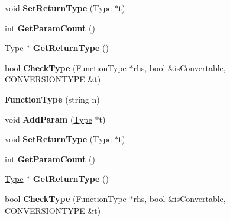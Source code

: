 \begin{DoxyCompactItemize}
\item 
\hypertarget{classFunctionType_a1462775c5732b70b07c689ab7088814d}{void {\bfseries Set\-Return\-Type} (\hyperlink{classType}{Type} $\ast$t)}\label{classFunctionType_a1462775c5732b70b07c689ab7088814d}

\item 
\hypertarget{classFunctionType_a8b6fed7ff4d79b5db3d39cd042326090}{int {\bfseries Get\-Param\-Count} ()}\label{classFunctionType_a8b6fed7ff4d79b5db3d39cd042326090}

\item 
\hypertarget{classFunctionType_a601e763553086c0d7a4c2de97d6de2bc}{\hyperlink{classType}{Type} $\ast$ {\bfseries Get\-Return\-Type} ()}\label{classFunctionType_a601e763553086c0d7a4c2de97d6de2bc}

\item 
\hypertarget{classFunctionType_a150840d05c02a26ca776aad22e0deed1}{bool {\bfseries Check\-Type} (\hyperlink{classFunctionType}{Function\-Type} $\ast$rhs, bool \&is\-Convertable, C\-O\-N\-V\-E\-R\-S\-I\-O\-N\-T\-Y\-P\-E \&t)}\label{classFunctionType_a150840d05c02a26ca776aad22e0deed1}

\item 
\hypertarget{classFunctionType_a924981ea6fc18a7a9ed4cb5c94a136d6}{{\bfseries Function\-Type} (string n)}\label{classFunctionType_a924981ea6fc18a7a9ed4cb5c94a136d6}

\item 
\hypertarget{classFunctionType_a9259c94250b6cb903c6013bc10a0b7bc}{void {\bfseries Add\-Param} (\hyperlink{classType}{Type} $\ast$t)}\label{classFunctionType_a9259c94250b6cb903c6013bc10a0b7bc}

\item 
\hypertarget{classFunctionType_a1462775c5732b70b07c689ab7088814d}{void {\bfseries Set\-Return\-Type} (\hyperlink{classType}{Type} $\ast$t)}\label{classFunctionType_a1462775c5732b70b07c689ab7088814d}

\item 
\hypertarget{classFunctionType_a8b6fed7ff4d79b5db3d39cd042326090}{int {\bfseries Get\-Param\-Count} ()}\label{classFunctionType_a8b6fed7ff4d79b5db3d39cd042326090}

\item 
\hypertarget{classFunctionType_a601e763553086c0d7a4c2de97d6de2bc}{\hyperlink{classType}{Type} $\ast$ {\bfseries Get\-Return\-Type} ()}\label{classFunctionType_a601e763553086c0d7a4c2de97d6de2bc}

\item 
\hypertarget{classFunctionType_a150840d05c02a26ca776aad22e0deed1}{bool {\bfseries Check\-Type} (\hyperlink{classFunctionType}{Function\-Type} $\ast$rhs, bool \&is\-Convertable, C\-O\-N\-V\-E\-R\-S\-I\-O\-N\-T\-Y\-P\-E \&t)}\label{classFunctionType_a150840d05c02a26ca776aad22e0deed1}


\end{DoxyCompactItemize}
